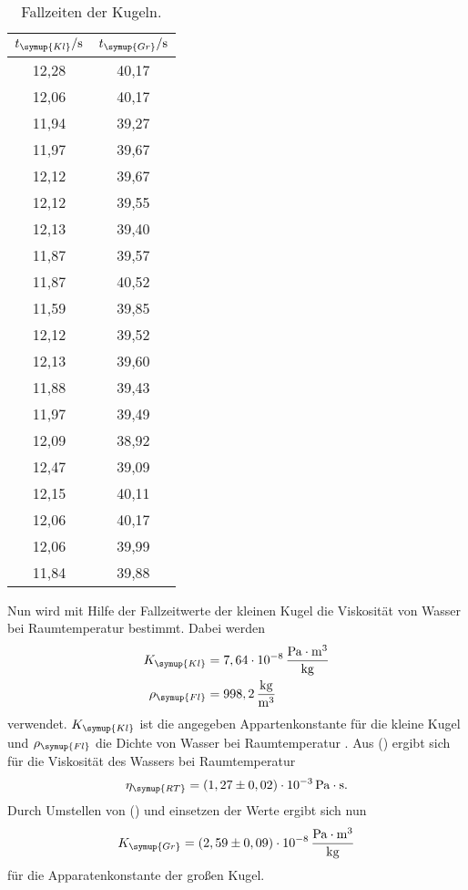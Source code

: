 \begin{table}
  \centering
  \caption{Fallzeiten der Kugeln.}
  \label{tab:Fallzeit}
  \begin{tabular}{c c}
    \toprule
    $t_{\symup{Kl}}/\unit{\second} $ & $t_{\symup{Gr}}/\unit{\second}$ \\
    \midrule
    12,28 & 40,17 \\
    12,06 & 40,17 \\
    11,94 & 39,27 \\
    11,97 & 39,67 \\
    12,12 & 39,67 \\
    12,12 & 39,55 \\
    12,13 & 39,40 \\
    11,87 & 39,57 \\
    11,87 & 40,52 \\
    11,59 & 39,85 \\
    12,12 & 39,52 \\
    12,13 & 39,60 \\
    11,88 & 39,43 \\
    11,97 & 39,49 \\
    12,09 & 38,92 \\
    12,47 & 39,09 \\
    12,15 & 40,11 \\
    12,06 & 40,17 \\
    12,06 & 39,99 \\
    11,84 & 39,88 \\
    \bottomrule
  \end{tabular}
\end{table}

Nun wird mit Hilfe der Fallzeitwerte der kleinen Kugel die Viskosität von Wasser bei Raumtemperatur bestimmt. Dabei werden
\begin{align*}
  K_{\symup{Kl}} &= 7,64\cdot 10^{-8} \,\frac{\unit{\pascal}\cdot\unit{\meter^3}}{\unit{\kilo\gram}} \\
  \rho_{\symup{Fl}} &= 998,2\,\frac{\unit{\kilo\gram}}{\unit{\meter^3}}
\end{align*}
verwendet. $K_{\symup{Kl}}$ ist die angegeben Appartenkonstante für die kleine Kugel \cite{anleitung107}  und $\rho_{\symup{Fl}}$
die Dichte von Wasser bei Raumtemperatur \cite{waterdensity}. Aus () ergibt sich für die Viskosität des Wassers bei Raumtemperatur
\begin{align*}
  \eta_{\symup{RT}} = (1,27 \pm 0,02)\cdot 10^{-3} \,\unit{\pascal}\cdot\unit{\second}.
\end{align*}
Durch Umstellen von () und einsetzen der Werte ergibt sich nun
\begin{align*}
  K_{\symup{Gr}} = (2,59 \pm 0,09)\cdot 10^{-8}\,\frac{\unit{\pascal}\cdot\unit{\meter^3}}{\unit{\kilo\gram}}
\end{align*}
für die Apparatenkonstante der großen Kugel.

